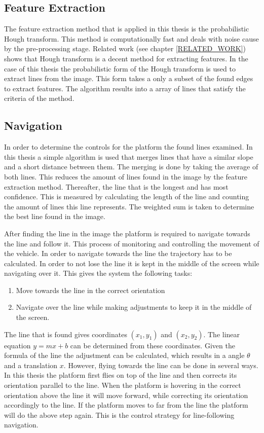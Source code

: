 \documentclass[a4paper]{article}
\begin{document}
\subsection{Feature Extraction}
The feature extraction method that is applied in this thesis is the probabilistic Hough transform. This method is computationally fast and deals with noise cause by the pre-processing stage. Related work (see chapter \ref{RELATED_WORK}) shows that Hough transform is a decent method for extracting features. In the case of this thesis the probabilistic form of the Hough transform\cite{Kiryati1991} is used to extract lines from the image. This form takes a only a subset of the found edges to extract features. The algorithm results into a array of lines that satisfy the criteria of the method.

\subsection{Navigation}

In order to determine the controls for the platform the found lines examined. In this thesis a simple algorithm is used that merges lines that have a similar slope and a short distance between them. The merging is done by taking the average of both lines. This reduces the amount of lines found in the image by the feature extraction method. Thereafter, the line that is the longest and has most confidence. This is measured by calculating the length of the line and counting the amount of lines this line represents. The weighted sum is taken to determine the best line found in the image.

After finding the line in the image the platform is required to navigate towards the line and follow it. This process of monitoring and controlling the movement of the vehicle. In order to navigate towards the line the trajectory has to be calculated. In order to not lose the line it is kept in the middle of the screen while navigating over it. This gives the system the following tasks:
\begin{enumerate}
\item Move towards the line in the correct orientation
\item Navigate over the line while making adjustments to keep it in the middle of the screen.
\end{enumerate}

The line that is found gives coordinates $(x_1, y_1)$ and $(x_2, y_2)$. The linear equation $y = mx + b$ can be determined from these coordinates. Given the formula of the line the adjustment can be calculated, which results in a angle $\theta$ and a translation $x$. However, flying towards the line can be done in several ways. In this thesis the platform first flies on top of the line and then corrects its orientation parallel to the line. When the platform is hovering in the correct orientation above the line it will move forward, while correcting its orientation accordingly to the line. If the platform moves to far from the line the platform will do the above step again. This is the control strategy for line-following navigation.
\end{document}
